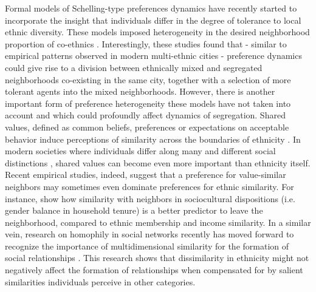 \documentclass{article}
\begin{document}
Formal models of Schelling-type preferences dynamics have recently started to incorporate the insight that individuals differ in the degree of tolerance to local ethnic diversity. These models imposed heterogeneity in the desired neighborhood proportion of co-ethnics \autocite{xie2012modeling, hatna2014combining}. Interestingly, these studies found that - similar to empirical patterns observed in modern multi-ethnic cities - preference dynamics could give rise to a division between ethnically mixed and segregated neighborhoods co-existing in the same city, together with a selection of more tolerant agents into the mixed neighborhoods. However, there is another important form of preference heterogeneity these models have not taken into account and which could profoundly affect dynamics of segregation. Shared values, defined as common beliefs, preferences or expectations on acceptable behavior induce perceptions of similarity across the boundaries of ethnicity \autocite{wimmer2013ethnic,bail2008configuration}. In modern societies where individuals differ along many and different social distinctions \autocite{vertovec2007super}, shared values can become even more important than ethnicity itself. Recent empirical studies, indeed, suggest that a preference for value-similar neighbors may sometimes even dominate preferences for ethnic similarity. For instance,\textcite{van2019sociocultural} show how similarity with neighbors in sociocultural dispositions (i.e. gender balance in household tenure) is a better predictor to leave the neighborhood, compared to ethnic membership and income similarity. In a similar vein, research on homophily in social networks recently has moved forward to recognize the importance of multidimensional similarity for the formation of social relationships \autocite{block2014multidimensional,hooijsma2020multidimensional}. This research shows that dissimilarity in ethnicity might not negatively affect the formation of relationships when compensated for by salient similarities individuals perceive in other categories. 
\end{document}
